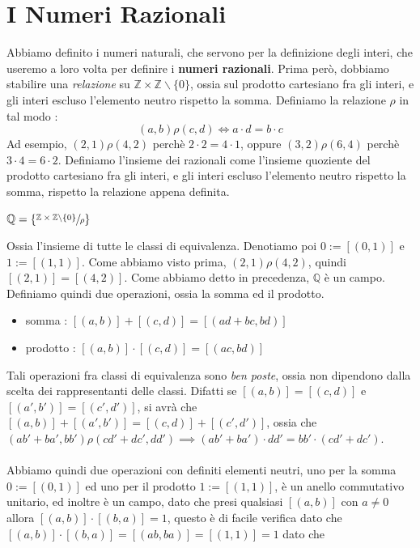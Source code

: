 \documentclass[12pt, letterpaper]{article}
\begin{document}
\section{I Numeri Razionali}
Abbiamo definito i numeri naturali, che servono per la definizione degli interi, che useremo a loro volta per definire 
i \textbf{numeri razionali}. Prima però, dobbiamo stabilire una \textit{relazione} su \(\mathbb{Z}\times\mathbb{Z}\backslash \{0\}\),
ossia sul prodotto cartesiano fra gli interi, e gli interi escluso l'elemento neutro rispetto la somma. Definiamo la 
relazione \(\rho\) in tal modo :\begin{equation}
    (a,b)\rho(c,d)\iff a\cdot d=b\cdot c
\end{equation}
Ad esempio, \((2,1)\rho(4,2)\) perchè \(2\cdot 2 = 4 \cdot 1\), oppure \((3,2)\rho(6,4)\) perchè \(3\cdot 4 = 6 \cdot 2\).
Definiamo l'insieme dei razionali come l'insieme quoziente del prodotto cartesiano fra gli interi, e gli interi 
escluso l'elemento neutro rispetto la somma, rispetto la relazione appena definita.\begin{center}
    \(\mathbb{Q}=\{\sfrac{\mathbb{Z}\times\mathbb{Z}\backslash \{0\}}{\rho}\}\)
\end{center}
Ossia l'insieme di tutte le classi di equivalenza. Denotiamo poi \(0:=[(0,1)]\) e \(1:=[(1,1)]\).
Come abbiamo visto prima, \((2,1)\rho(4,2)\), quindi \([(2,1)]=[(4,2)]\). Come abbiamo detto in precedenza, 
\(\mathbb{Q}\) è un campo. Definiamo quindi due operazioni, ossia la somma ed il prodotto.\begin{itemize}
    \item somma : \([(a,b)]+[(c,d)]=[(ad+bc,bd)]\)
    \item prodotto : \([(a,b)]\cdot[(c,d)]=[(ac,bd)]\)
\end{itemize}
Tali operazioni fra classi di equivalenza sono \textit{ben poste}, ossia non dipendono dalla scelta dei rappresentanti 
delle classi. Difatti se \([(a,b)]=[(c,d)]\) e  \([(a',b')]=[(c',d')]\), si avrà che \([(a,b)]+[(a',b')]=[(c,d)]+[(c',d')]\), ossia 
che \((ab'+ba',bb')\rho(cd'+dc',dd')\implies (ab'+ba')\cdot dd' = bb' \cdot (cd'+dc')\). \\\hphantom{.}\\Abbiamo quindi due
operazioni con definiti elementi neutri, uno per la somma \(0:=[(0,1)]\) ed uno per il prodotto  \(1:=[(1,1)]\), è un 
anello commutativo unitario, ed inoltre è un campo, dato che presi qualsiasi \([(a,b)]\) con \(a\ne 0\) allora 
\([(a,b)]\cdot[(b,a)]=1\), questo è di facile verifica dato che \([(a,b)]\cdot[(b,a)]=[(ab,ba)]=[(1,1)]=1\) dato che 
\end{document}

